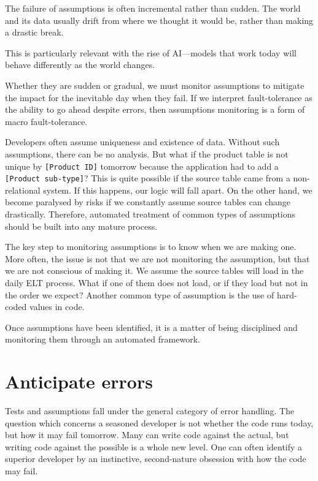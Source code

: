 \documentclass[10pt,openany,10pt]{book}
\begin{document}
The failure of assumptions is often incremental rather than sudden. The
world and its data usually drift from where we thought it would be,
rather than making a drastic break.

This is particularly relevant with the rise of AI---models that work
today will behave differently as the world changes.

Whether they are sudden or gradual, we must monitor assumptions to
mitigate the impact for the inevitable day when they fail. If we
interpret fault-tolerance as the ability to go ahead despite errors,
then assumptions monitoring is a form of macro fault-tolerance.

Developers often assume uniqueness and existence of data. Without such
assumptions, there can be no analysis. But what if the product table is
not unique by \texttt{{[}Product\ ID{]}} tomorrow because the
application had to add a \texttt{{[}Product\ sub-type{]}}? This is quite
possible if the source table came from a non-relational system. If this
happens, our logic will fall apart. On the other hand, we become
paralysed by risks if we constantly assume source tables can change
drastically. Therefore, automated treatment of common types of
assumptions should be built into any mature process.

The key step to monitoring assumptions is to know when we are making
one. More often, the issue is not that we are not monitoring the
assumption, but that we are not conscious of making it. We assume the
source tables will load in the daily ELT process. What if one of them
does not load, or if they load but not in the order we expect? Another
common type of assumption is the use of hard-coded values in code.

Once assumptions have been identified, it is a matter of being
disciplined and monitoring them through an automated framework.

\section{Anticipate errors}\label{anticipate-errors}

Tests and assumptions fall under the general category of error handling.
The question which concerns a seasoned developer is not whether the code
runs today, but how it may fail tomorrow. Many can write code against
the actual, but writing code against the possible is a whole new level.
One can often identify a superior developer by an instinctive,
second-nature obsession with how the code may fail.
\end{document}
